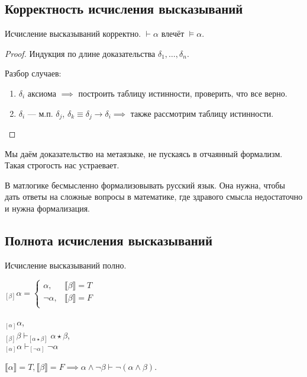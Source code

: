 \subsection{Корректность исчисления высказываний}
\begin{theorem}
    Исчисление высказываний корректно.
    $\vdash \alpha$ влечёт $\vDash \alpha$.
\end{theorem}
\begin{proof}
    Индукция по длине доказательства $\delta_1, \dots, \delta_n$.

    Разбор случаев:
    \begin{enumerate}
        \item $\delta_i$ аксиома $\implies$ построить таблицу истинности, проверить, что все верно.
        \item $\delta_i$ --- м.п. $\delta_j$, $\delta_k \equiv \delta_j \to \delta_i \implies$ также рассмотрим таблицу истинности.
    \end{enumerate}
\end{proof}

Мы даём доказательство на метаязыке, не пускаясь в отчаянный формализм.
Такая строгость нас устраевает.

В матлогике бесмысленно формализовывать русский язык.
Она нужна, чтобы дать ответы на сложные вопросы в математике, где здравого смысла недостаточно и нужна формализация.

\subsection{Полнота исчисления высказываний}
\begin{theorem}
    Исчисление высказываний полно.
\end{theorem}

\begin{definition}
    $_{[\beta]}\alpha =
    \begin{cases}
        \alpha, & \llbracket \beta \rrbracket = T\\
        \neg \alpha,&  \llbracket \beta \rrbracket = F\\
    \end{cases}$
\end{definition}

\begin{lemma}
    $_{[\alpha]}\alpha$, \\ $_{[\beta]}\beta \vdash _{[\alpha \star \beta]} \alpha \star \beta$, \\
    $_{[\alpha]} \alpha \vdash _{[\neg \alpha]}\neg\alpha $
\end{lemma}
\begin{example}
    $\llbracket \alpha \rrbracket = T, \llbracket \beta \rrbracket = F \implies  \alpha \wedge \neg \beta \vdash \neg (\alpha \wedge \beta) $.
\end{example}

